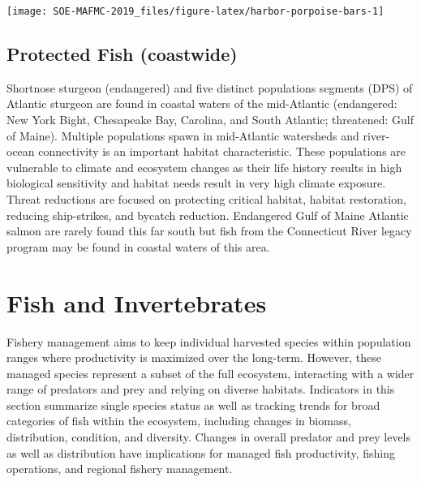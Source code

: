\documentclass[10pt,]{article}
\let\origfigure\figure
\let\endorigfigure\endfigure
\renewenvironment{figure}[1][2] {
    \expandafter\origfigure\expandafter[H]
} {
    \endorigfigure
}
\begin{document}
\begin{figure}

{\centering \texttt{[image: SOE-MAFMC-2019\_files/figure-latex/harbor-porpoise-bars-1]} 

}

\caption{Harbor porpoise bycatch estimate (black) shown with Potential Biological Removal (red). Error bars indicate 95\% confidence interval.}\label{fig:harbor-porpoise-bars}
\end{figure}

\subsection{Protected Fish (coastwide)}\label{protected-fish-coastwide}

Shortnose sturgeon (endangered) and five distinct populations segments
(DPS) of Atlantic sturgeon are found in coastal waters of the
mid-Atlantic (endangered: New York Bight, Chesapeake Bay, Carolina, and
South Atlantic; threatened: Gulf of Maine). Multiple populations spawn
in mid-Atlantic watersheds and river-ocean connectivity is an important
habitat characteristic. These populations are vulnerable to climate and
ecosystem changes as their life history results in high biological
sensitivity and habitat needs result in very high climate exposure.
Threat reductions are focused on protecting critical habitat, habitat
restoration, reducing ship-strikes, and bycatch reduction. Endangered
Gulf of Maine Atlantic salmon are rarely found this far south but fish
from the Connecticut River legacy program may be found in coastal waters
of this area.

\newpage

\section{Fish and Invertebrates}\label{fish-and-invertebrates}

Fishery management aims to keep individual harvested species within
population ranges where productivity is maximized over the long-term.
However, these managed species represent a subset of the full ecosystem,
interacting with a wider range of predators and prey and relying on
diverse habitats. Indicators in this section summarize single species
status as well as tracking trends for broad categories of fish within
the ecosystem, including changes in biomass, distribution, condition,
and diversity. Changes in overall predator and prey levels as well as
distribution have implications for managed fish productivity, fishing
operations, and regional fishery management.
\end{document}
